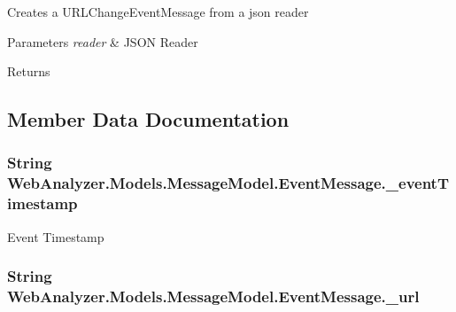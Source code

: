 Creates a U\+R\+L\+Change\+Event\+Message from a json reader 


\begin{DoxyParams}{Parameters}
{\em reader} & J\+S\+O\+N Reader\\
\hline
\end{DoxyParams}
\begin{DoxyReturn}{Returns}

\end{DoxyReturn}


\subsection{Member Data Documentation}
\hypertarget{class_web_analyzer_1_1_models_1_1_message_model_1_1_event_message_a48a2a6f84fb71c7083b757af773fc183}{}
\subsubsection[{\+\_\+event\+Timestamp}]{\setlength{\rightskip}{0pt plus 5cm}String Web\+Analyzer.\+Models.\+Message\+Model.\+Event\+Message.\+\_\+event\+Timestamp\hspace{0.3cm}{\ttfamily [protected]}}\label{class_web_analyzer_1_1_models_1_1_message_model_1_1_event_message_a48a2a6f84fb71c7083b757af773fc183}


Event Timestamp 

\hypertarget{class_web_analyzer_1_1_models_1_1_message_model_1_1_event_message_aef3ed320a568084cd131451ccc71fc8b}{}
\subsubsection[{\+\_\+url}]{\setlength{\rightskip}{0pt plus 5cm}String Web\+Analyzer.\+Models.\+Message\+Model.\+Event\+Message.\+\_\+url\hspace{0.3cm}{\ttfamily [protected]}}\label{class_web_analyzer_1_1_models_1_1_message_model_1_1_event_message_aef3ed320a568084cd131451ccc71fc8b}


